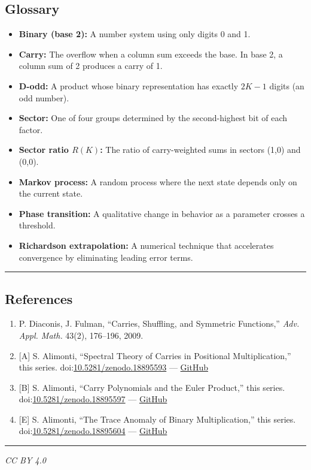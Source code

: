 \documentclass[
  11pt,
]{article}
\providecommand{\tightlist}{%
  \setlength{\itemsep}{0pt}\setlength{\parskip}{0pt}}
\begin{document}
\newpage

\subsection{Glossary}\label{glossary}

\begin{itemize}
\tightlist
\item
  \textbf{Binary (base 2):} A number system using only digits 0 and 1.
\item
  \textbf{Carry:} The overflow when a column sum exceeds the base. In base 2, a
  column sum of 2 produces a carry of 1.
\item
  \textbf{D-odd:} A product whose binary representation has exactly \(2K - 1\)
  digits (an odd number).
\item
  \textbf{Sector:} One of four groups determined by the second-highest bit of
  each factor.
\item
  \textbf{Sector ratio \(R(K)\):} The ratio of carry-weighted sums in sectors
  (1,0) and (0,0).
\item
  \textbf{Markov process:} A random process where the next state depends only on
  the current state.
\item
  \textbf{Phase transition:} A qualitative change in behavior as a parameter
  crosses a threshold.
\item
  \textbf{Richardson extrapolation:} A numerical technique that accelerates
  convergence by eliminating leading error terms.
\end{itemize}

\begin{center}\rule{0.5\linewidth}{0.5pt}\end{center}

\newpage

\subsection{References}\label{references}

\begin{enumerate}
\def\labelenumi{\arabic{enumi}.}
\tightlist
\item
  P. Diaconis, J. Fulman, ``Carries, Shuffling, and Symmetric Functions,''
  \emph{Adv. Appl. Math.} 43(2), 176--196, 2009.
\item
  {[}A{]} S. Alimonti, ``Spectral Theory of Carries in Positional
  Multiplication,'' this series.
  doi:\href{https://doi.org/10.5281/zenodo.18895593}{10.5281/zenodo.18895593}
  ---
  \href{https://github.com/stefanoalimonti/carry-arithmetic-A-spectral-theory}{GitHub}
\item
  {[}B{]} S. Alimonti, ``Carry Polynomials and the Euler Product,'' this series.
  doi:\href{https://doi.org/10.5281/zenodo.18895597}{10.5281/zenodo.18895597}
  ---
  \href{https://github.com/stefanoalimonti/carry-arithmetic-B-zeta-approximation}{GitHub}
\item
  {[}E{]} S. Alimonti, ``The Trace Anomaly of Binary Multiplication,'' this
  series.
  doi:\href{https://doi.org/10.5281/zenodo.18895604}{10.5281/zenodo.18895604}
  ---
  \href{https://github.com/stefanoalimonti/carry-arithmetic-E-trace-anomaly}{GitHub}
\end{enumerate}

\begin{center}\rule{0.5\linewidth}{0.5pt}\end{center}

\emph{CC BY 4.0}
\end{document}
